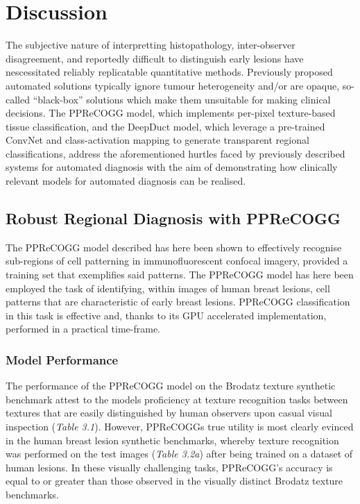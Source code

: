 \chapter{Discussion}


The subjective nature of interpretting histopathology, inter-observer disagreement, and reportedly difficult to distinguish early lesions have nescessitated reliably replicatable quantitative methods. Previously proposed automated solutions typically ignore tumour heterogeneity and/or are opaque, so-called ``black-box'' solutions which make them unsuitable for making clinical decisions. The PPReCOGG model, which implements per-pixel texture-based tissue classification, and the DeepDuct model, which leverage a pre-trained ConvNet and class-activation mapping to generate transparent regional classifications, address the aforementioned hurtles faced by previously described systems for automated diagnosis with the aim of demonstrating how clinically relevant models for automated diagnosis can be realised.

\section{Robust Regional Diagnosis with PPReCOGG}

The PPReCOGG model described has here been shown to effectively recognise sub-regions of cell patterning in immunofluorescent confocal imagery, provided a training set that exemplifies said patterns. The PPReCOGG model has here been employed the task of identifying, within images of human breast lesions, cell patterns that are characteristic of early breast lesions. PPReCOGG classification in this task is effective and, thanks to its GPU accelerated implementation, performed in a practical time-frame.\par

\subsection{Model Performance}
The performance of the PPReCOGG model on the Brodatz texture synthetic benchmark attest to the models proficiency at texture recognition tasks between textures that are easily distinguished by human observers upon casual visual inspection (\textit{Table 3.1}). However, PPReCOGGs true utility is most clearly evinced in the human breast lesion synthetic benchmarks, whereby texture recognition was performed on the test images (\textit{Table 3.2a}) after being trained on a dataset of human lesions. In these visually challenging tasks, PPReCOGG's accuracy is equal to or greater than those observed in the visually distinct Brodatz texture benchmarks.\par

